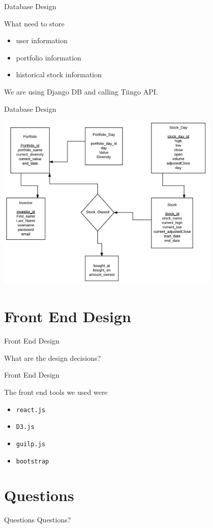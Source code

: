 \documentclass{beamer}
\begin{document}
\begin{frame}{Database Design}

What need to store
\begin{itemize}
	\item user information
	\item portfolio information
	\item historical stock information
\end{itemize}

We are using Django DB and calling Tiingo API.

\end{frame}


\begin{frame}{Database Design}

\centering
\includegraphics[width=0.8\textwidth]{db_diagram}

\end{frame}

\section{Front End Design}

\begin{frame}{Front End Design}

What are the design decisions?

\end{frame}

\begin{frame}{Front End Design}

The front end tools we used were
\begin{itemize}
	\item \texttt{react.js}
	\item \texttt{D3.js}
	\item \texttt{guilp.js}
	\item \texttt{bootstrap}
\end{itemize}

\end{frame}

\section*{Questions}
\begin{frame}{Questions}
\centering
Questions?
\end{frame}
\end{document}
